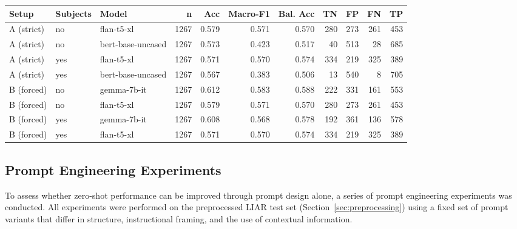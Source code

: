 \begin{minipage}{\linewidth}
\centering
{}
\label{tab:zeroshot_top2}
\scriptsize
\begin{tabular}{ll l r r r r r r r r}
\toprule
Setup & Subjects & Model & n & Acc & Macro-F1 & Bal. Acc & TN & FP & FN & TP \\
\midrule
A (strict) & no  & flan-t5-xl        & 1267 & 0.579 & 0.571 & 0.570 & 280 & 273 & 261 & 453 \\
A (strict) & no  & bert-base-uncased & 1267 & 0.573 & 0.423 & 0.517 &  40 & 513 &  28 & 685 \\
\addlinespace
A (strict) & yes & flan-t5-xl        & 1267 & 0.571 & 0.570 & 0.574 & 334 & 219 & 325 & 389 \\
A (strict) & yes & bert-base-uncased & 1267 & 0.567 & 0.383 & 0.506 &  13 & 540 &   8 & 705 \\
\midrule
B (forced) & no  & gemma-7b-it       & 1267 & 0.612 & 0.583 & 0.588 & 222 & 331 & 161 & 553 \\
B (forced) & no  & flan-t5-xl        & 1267 & 0.579 & 0.571 & 0.570 & 280 & 273 & 261 & 453 \\
\addlinespace
B (forced) & yes & gemma-7b-it       & 1267 & 0.608 & 0.568 & 0.578 & 192 & 361 & 136 & 578 \\
B (forced) & yes & flan-t5-xl        & 1267 & 0.571 & 0.570 & 0.574 & 334 & 219 & 325 & 389 \\
\bottomrule
\end{tabular}
\end{minipage}

\subsection{Prompt Engineering Experiments}

To assess whether zero-shot performance can be improved through prompt design alone, a series of prompt engineering experiments was conducted. All experiments were performed on the preprocessed LIAR test set (Section~\ref{sec:preprocessing}) using a fixed set of prompt variants that differ in structure, instructional framing, and the use of contextual information.

